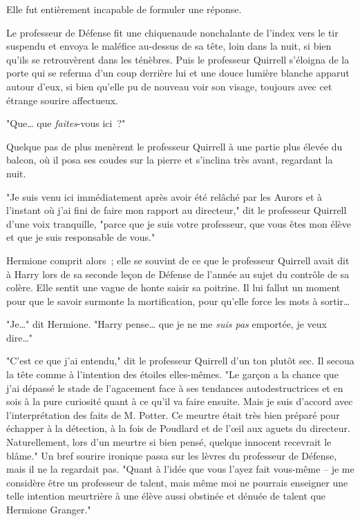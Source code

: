 Elle fut entièrement incapable de formuler une réponse.

Le professeur de Défense fit une chiquenaude nonchalante de l'index vers le tir suspendu et envoya le maléfice au-dessus de sa tête, loin dans la nuit, si bien qu'ils se retrouvèrent dans les ténèbres. Puis le professeur Quirrell s'éloigna de la porte qui se referma d'un coup derrière lui et une douce lumière blanche apparut autour d'eux, si bien qu'elle pu de nouveau voir son visage, toujours avec cet étrange sourire affectueux.

"Que… que \emph{faites}-vous ici~?"

Quelque pas de plus menèrent le professeur Quirrell à une partie plus élevée du balcon, où il posa ses coudes sur la pierre et s'inclina très avant, regardant la nuit.

"Je suis venu ici immédiatement après avoir été relâché par les Aurors et à l'instant où j'ai fini de faire mon rapport au directeur," dit le professeur Quirrell d'une voix tranquille, "parce que je suis votre professeur, que vous êtes mon élève et que je suis responsable de vous."

Hermione comprit alors~; elle se souvint de ce que le professeur Quirrell avait dit à Harry lors de sa seconde leçon de Défense de l'année au sujet du contrôle de sa colère. Elle sentit une vague de honte saisir sa poitrine. Il lui fallut un moment pour que le savoir surmonte la mortification, pour qu'elle force les mots à sortir…

"Je…" dit Hermione. "Harry pense… que je ne me \emph{suis pas} emportée, je veux dire…"

"C'est ce que j'ai entendu," dit le professeur Quirrell d'un ton plutôt sec. Il secoua la tête comme à l'intention des étoiles elles-mêmes. "Le garçon a la chance que j'ai dépassé le stade de l'agacement face à ses tendances autodestructrices et en sois à la pure curiosité quant à ce qu'il va faire ensuite. Mais je suis d'accord avec l'interprétation des faits de M. Potter. Ce meurtre était très bien préparé pour échapper à la détection, à la fois de Poudlard et de l'œil aux aguets du directeur. Naturellement, lors d'un meurtre si bien pensé, quelque innocent recevrait le blâme." Un bref sourire ironique passa sur les lèvres du professeur de Défense, mais il ne la regardait pas. "Quant à l'idée que vous l'ayez fait vous-même -- je me considère être un professeur de talent, mais même moi ne pourrais enseigner une telle intention meurtrière à une élève aussi obstinée et dénuée de talent que Hermione Granger."

